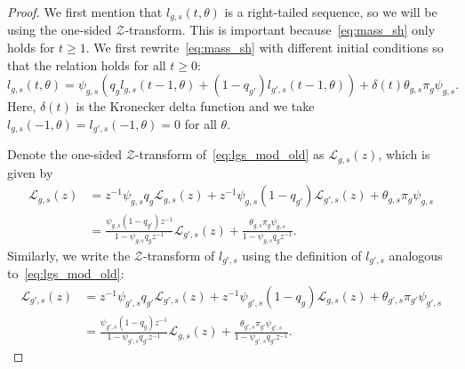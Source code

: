 \documentclass[letterpaper]{article} %
\begin{document}
\begin{proof}
We first mention that $l_{g,s}(t,\theta)$ is a right-tailed sequence, so we will be using the one-sided $\mathcal{Z}$-transform. 
This is important because~\eqref{eq:mass_sh} only holds for $t \geq 1$.
We first rewrite~\eqref{eq:mass_sh} with different initial conditions so that the relation holds for all $t \geq 0$:
\begin{equation}
    l_{g,s}(t,\theta) = \psi_{g,s}\left( q_g l_{g,s}(t-1,\theta) + (1-q_{g'}) l_{g',s}(t-1,\theta) \right) \label{eq:lgs_mod_old} + \delta(t)\theta_{g,s} \pi_g \psi_{g,s}.
\end{equation}
Here, $\delta(t)$ is the Kronecker delta function and we take $l_{g,s}(-1,\theta) = l_{g',s}(-1,\theta) = 0$ for all $\theta$.

Denote the one-sided $\mathcal{Z}$-transform of~\eqref{eq:lgs_mod_old} as $\mathcal{L}_{g,s}(z)$, which is given by
\begin{align}
   \mathcal{L}_{g,s}(z) &= z^{-1} \psi_{g,s}q_g \mathcal{L}_{g,s}(z) + z^{-1} \psi_{g,s}(1-q_{g'}) \mathcal{L}_{g',s}(z) + \theta_{g,s} \pi_g \psi_{g,s} \nonumber \\
   &= \frac{\psi_{g,s}(1-q_{g'})z^{-1}}{1 - \psi_{g,s}q_gz^{-1}}\mathcal{L}_{g',s}(z) + \frac{\theta_{g,s} \pi_g \psi_{g,s}}{1 - \psi_{g,s}q_gz^{-1}}. \label{eq:zlgs_old}
\end{align}
Similarly, we write the $\mathcal{Z}$-transform of $l_{g',s}$ using the definition of $l_{g',s}$ analogous to~\eqref{eq:lgs_mod_old}:
\begin{align}
   \mathcal{L}_{g',s}(z) &= z^{-1} \psi_{g',s}q_{g'} \mathcal{L}_{g',s}(z) + z^{-1} \psi_{g',s}(1-q_{g}) \mathcal{L}_{g,s}(z) + \theta_{g',s} \pi_{g'} \psi_{g',s} \nonumber\\
   &= \frac{\psi_{g',s}(1-q_{g})z^{-1}}{1 - \psi_{g',s}q_{g'}z^{-1}}\mathcal{L}_{g,s}(z) + \frac{\theta_{g',s} \pi_{g'} \psi_{g',s}}{1 - \psi_{g',s}q_{g'}z^{-1}}. \label{eq:zlg's_old}
\end{align}


\end{proof}
\end{document}
